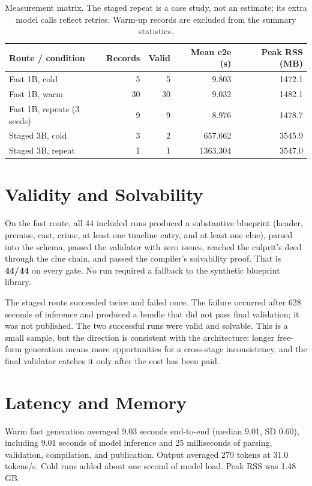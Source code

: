 ﻿\documentclass[11pt,a4paper]{report}
\newcommand{\good}[1]{\textcolor{FGreen}{\textbf{#1}}}
\begin{document}
\begin{table}[htbp]
  \centering
  \small
  \begin{tabular}{@{}lrrrr@{}}
    \toprule
    \textbf{Route / condition} & \textbf{Records} & \textbf{Valid} & \textbf{Mean e2e (s)} & \textbf{Peak RSS (MB)} \\
    \midrule
    Fast 1B, cold & 5 & 5 & 9.803 & 1472.1 \\
    Fast 1B, warm & 30 & 30 & 9.032 & 1482.1 \\
    Fast 1B, repeats (3 seeds) & 9 & 9 & 8.976 & 1478.7 \\
    Staged 3B, cold & 3 & 2 & 657.662 & 3545.9 \\
    Staged 3B, repeat & 1 & 1 & 1363.304 & 3547.0 \\
    \bottomrule
  \end{tabular}
  \caption{Measurement matrix. The staged repeat is a case study, not an estimate; its extra model calls reflect retries. Warm-up records are excluded from the summary statistics.}
  \label{tab:runs}
\end{table}

\section{Validity and Solvability}
On the fast route, all 44 included runs produced a substantive blueprint (header, premise, cast, crime, at least one timeline entry, and at least one clue), parsed into the schema, passed the validator with zero issues, reached the culprit's deed through the clue chain, and passed the compiler's solvability proof. That is \good{44/44} on every gate. No run required a fallback to the synthetic blueprint library.

The staged route succeeded twice and failed once. The failure occurred after 628 seconds of inference and produced a bundle that did not pass final validation; it was not published. The two successful runs were valid and solvable. This is a small sample, but the direction is consistent with the architecture: longer free-form generation means more opportunities for a cross-stage inconsistency, and the final validator catches it only after the cost has been paid.

\section{Latency and Memory}
Warm fast generation averaged 9.03 seconds end-to-end (median 9.01, SD 0.60), including 9.01 seconds of model inference and 25 milliseconds of parsing, validation, compilation, and publication. Output averaged 279 tokens at 31.0 tokens/s. Cold runs added about one second of model load. Peak RSS was 1.48\,GB.
\end{document}
